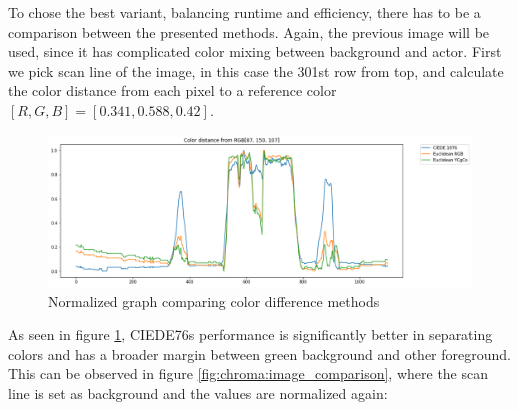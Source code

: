 To chose the best variant, balancing runtime and efficiency, there has to be a 
comparison between the presented methods. Again, the previous image will be 
used, since it has complicated color mixing between background and actor. First 
we pick scan line of the image, in this case the 301st row from top, and 
calculate the color distance from each pixel to a reference color $[R, G, B] = 
[0.341, 0.588, 0.42]$.

\begin{figure}[htb]
	\includegraphics[width=\textwidth]{gfx/distances/dist-comp.png}
	\caption{Normalized graph comparing color difference methods}
	\label{fig:chroma:comparison_graph}
\end{figure}

As seen in figure \ref{fig:chroma:comparison_graph}, CIEDE76s performance is 
significantly better in separating colors and has a broader margin between 
green background and other foreground. This can be observed in figure 
\ref{fig:chroma:image_comparison}, where the scan line is set as background and 
the values are normalized again:

